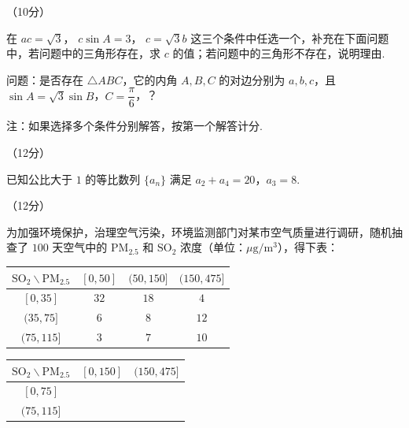 \documentclass[a4paper,11pt]{report}
\begin{document}
\begin{examanswers}[start=17]

\item（10分）

在  $ac=\sqrt3$， $c\sin A=3$， $c=\sqrt3b$ 这三个条件中任选一个，补充在下面问题中，若问题中的三角形存在，求 $c$ 的值；若问题中的三角形不存在，说明理由.

问题：是否存在 $\triangle ABC$，它的内角 $A,B,C$ 的对边分别为 $a,b,c$，且 $\sin A=\sqrt3\sin B$，$C=\dfrac{\pi}{6}$，\blank？

注：如果选择多个条件分别解答，按第一个解答计分.

\item（12分）

已知公比大于 $1$ 的等比数列 $\{a_n\}$ 满足 $a_2+a_4=20$，$a_3=8$.



\item（12分）

为加强环境保护，治理空气污染，环境监测部门对某市空气质量进行调研，随机抽查了 $100$ 天空气中的 $\mathrm{PM}_{2.5}$ 和 $\mathrm{SO}_2$ 浓度（单位：$\mu\mathrm{g}/\mathrm{m}^3$），得下表：

\begin{tightcenter}
{\renewcommand{\arraystretch}{0.9}
\begin{tabular}{|c|c|c|c|}
\hline
$\mathrm{SO}_2\backslash \mathrm{PM}_{2.5}$ & $[0,50]$ & $(50,150]$ & $(150,475]$\\ \hline
$[0,35]$ & $32$ & $18$ & $4$\\ \hline
$(35,75]$ & $6$ & $8$ & $12$\\ \hline
$(75,115]$ & $3$ & $7$ & $10$\\ \hline
\end{tabular}}
\end{tightcenter}



\begin{tightcenter}
{\renewcommand{\arraystretch}{0.9}
\begin{tabular}{|c|c|c|}
\hline
$\mathrm{SO}_2\backslash \mathrm{PM}_{2.5}$ & $[0,150]$ & $(150,475]$\\ \hline
$[0,75]$ &  & \\ \hline
$(75,115]$ &  & \\ \hline
\end{tabular}}
\end{tightcenter}


\end{examanswers}
\end{document}
